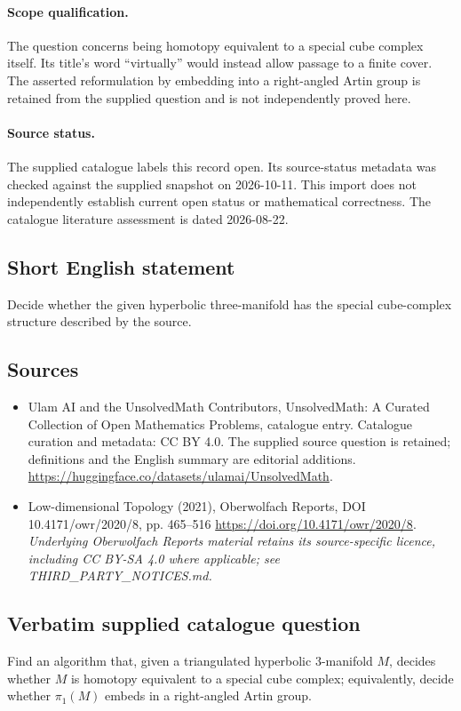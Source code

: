 \documentclass[11pt]{article}
\begin{document}
\paragraph{Scope qualification.}
The question concerns being homotopy equivalent to a special cube complex itself. Its title's word ``virtually'' would instead allow passage to a finite cover. The asserted reformulation by embedding into a right-angled Artin group is retained from the supplied question and is not independently proved here.
\paragraph{Source status.}
The supplied catalogue labels this record open. Its source-status metadata was checked against the supplied snapshot on 2026-10-11. This import does not independently establish current open status or mathematical correctness. The catalogue literature assessment is dated 2026-08-22.
\subsection{Short English statement}
Decide whether the given hyperbolic three-manifold has the special cube-complex structure described by the source.
\subsection{Sources}
\begin{itemize}
\item[S1] Ulam AI and the UnsolvedMath Contributors, UnsolvedMath: A Curated Collection of Open Mathematics Problems, catalogue entry. Catalogue curation and metadata: CC BY 4.0. The supplied source question is retained; definitions and the English summary are editorial additions.
\url{https://huggingface.co/datasets/ulamai/UnsolvedMath}.
\item[S2] Low-dimensional Topology (2021), Oberwolfach Reports, DOI 10.4171/owr/2020/8, pp. 465--516
\url{https://doi.org/10.4171/owr/2020/8}.
\textit{Underlying Oberwolfach Reports material retains its source-specific licence, including CC BY-SA 4.0 where applicable; see THIRD\_PARTY\_NOTICES.md.}
\end{itemize}
\subsection{Verbatim supplied catalogue question}
Find an algorithm that, given a triangulated hyperbolic $3$-manifold $M$, decides whether $M$ is homotopy equivalent to a special cube complex; equivalently, decide whether $\pi_1(M)$ embeds in a right-angled Artin group.
\end{document}
